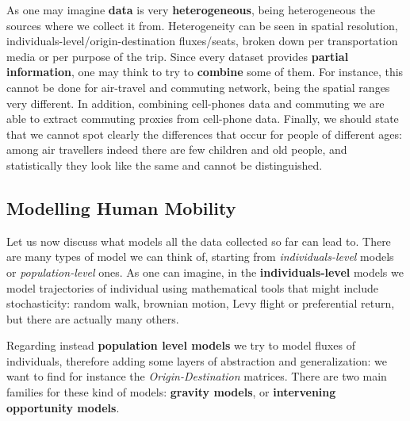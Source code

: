 \documentclass[../main/main.tex]{subfiles}
\begin{document}
As one may imagine \textbf{data} is very \textbf{heterogeneous}, being heterogeneous the sources where we collect it from. Heterogeneity can be seen in spatial resolution, individuals-level/origin-destination fluxes/seats, broken down per transportation media or per purpose of the trip. Since every dataset provides \textbf{partial information}, one may think to try to \textbf{combine} some of them. For instance, this cannot be done for air-travel and commuting network, being the spatial ranges very different. In addition, combining cell-phones data and commuting we are able to extract commuting proxies from cell-phone data. Finally, we should state that we cannot spot clearly the differences that occur for people of different ages: among air travellers indeed there are few children and old people, and statistically they look like the same and cannot be distinguished.



\subsection{Modelling Human Mobility}

Let us now discuss what models all the data collected so far can lead to. There are many types of model we can think of, starting from \textit{individuals-level} models or \textit{population-level} ones. As one can imagine, in the \textbf{individuals-level} models we model trajectories of individual using mathematical tools that might include stochasticity: random walk, brownian motion, Levy flight or preferential return, but there are actually many others.

Regarding instead \textbf{population level models} we try to model fluxes of individuals, therefore adding some layers of abstraction and generalization: we want to find for instance the \textit{Origin-Destination} matrices. There are two main families for these kind of models: \textbf{gravity models}, or \textbf{intervening opportunity models}.
\end{document}
